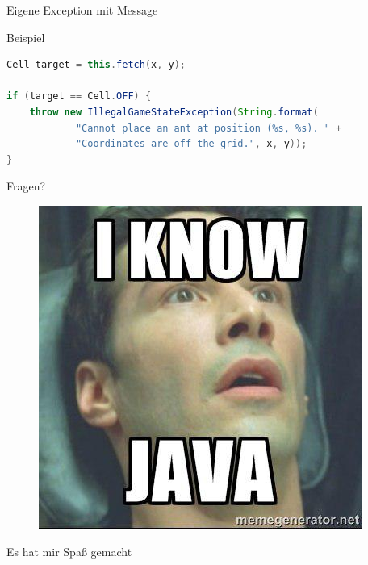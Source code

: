 \documentclass[18pt]{beamer}
\begin{document}
\begin{frame}[fragile]{Eigene Exception mit Message}
    \begin{exampleblock}{Beispiel}
        \begin{lstlisting}[language=Java,basicstyle=\scriptsize]
Cell target = this.fetch(x, y);

if (target == Cell.OFF) {
    throw new IllegalGameStateException(String.format(
            "Cannot place an ant at position (%s, %s). " +
            "Coordinates are off the grid.", x, y));
}
        \end{lstlisting}
    \end{exampleblock}

\end{frame}

\appendix
\beginbackup

\begin{frame}{Fragen?}
    \begin{figure}
        \includegraphics[scale=.4]{img/iknowjava.jpg}
    \end{figure}
\end{frame}

\begin{frame}{\quad}
    \center
    \Large{Es hat mir Spaß gemacht}
\end{frame}
\end{document}
